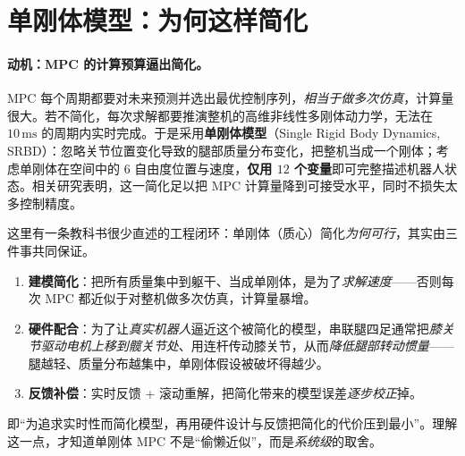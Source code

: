 \section{单刚体模型：为何这样简化}
\label{sec:srbd}

\paragraph{动机：MPC 的计算预算逼出简化。}
MPC 每个周期都要对未来预测并选出最优控制序列，\emph{相当于做多次仿真}，计算量很大。若不简化，每次求解都要推演整机的高维非线性多刚体动力学，无法在 $10\,\mathrm{ms}$ 的周期内实时完成。于是采用\textbf{单刚体模型}（Single Rigid Body Dynamics, SRBD）：忽略关节位置变化导致的腿部质量分布变化，把整机当成一个刚体；考虑单刚体在空间中的 $6$ 自由度位置与速度，\textbf{仅用 $12$ 个变量}即可完整描述机器人状态。相关研究表明，这一简化足以把 MPC 计算量降到可接受水平，同时不损失太多控制精度\cite{dicarlo2018cheetah}。

\begin{insight}\label{ins:com-simplify}
这里有一条教科书很少直述的工程闭环：单刚体（质心）简化\emph{为何可行}，其实由三件事共同保证。
\begin{enumerate}
  \item \textbf{建模简化}：把所有质量集中到躯干、当成单刚体，是为了\emph{求解速度}——否则每次 MPC 都近似于对整机做多次仿真，计算量暴增。
  \item \textbf{硬件配合}：为了让\emph{真实机器人}逼近这个被简化的模型，串联腿四足通常把\emph{膝关节驱动电机上移到髋关节处}、用连杆传动膝关节，从而\emph{降低腿部转动惯量}——腿越轻、质量分布越集中，单刚体假设被破坏得越少。
  \item \textbf{反馈补偿}：实时反馈 + 滚动重解，把简化带来的模型误差\emph{逐步校正}掉。
\end{enumerate}
即“为追求实时性而简化模型，再用硬件设计与反馈把简化的代价压到最小”。理解这一点，才知道单刚体 MPC 不是“偷懒近似”，而是\emph{系统级}的取舍。
\end{insight}

